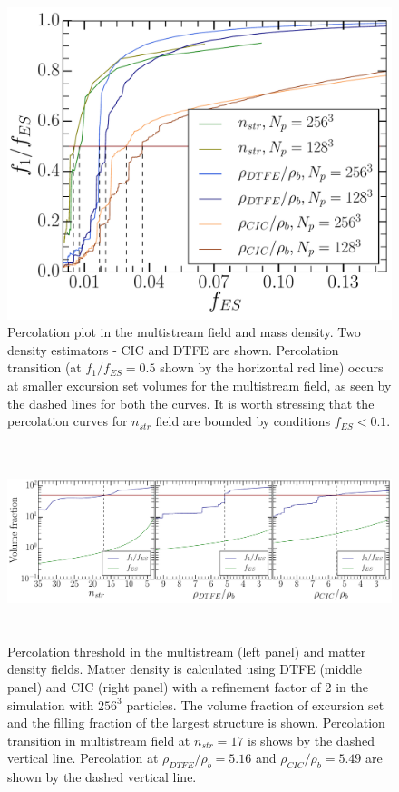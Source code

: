 \begin{figure}
\begin{minipage}[t]{.99\linewidth}
  \centering\includegraphics[width=10.cm]{Chapter4/Source_v2/fig4.pdf} 
\end{minipage}\hfill
\caption{Percolation plot in the multistream field and mass density. Two density estimators - CIC and DTFE are shown. Percolation transition (at $f_1/f_{ES} = 0.5$ shown by the horizontal red line) occurs at smaller excursion set volumes for the multistream field, as seen by the dashed lines for both the curves. It is worth stressing that the percolation curves for $n_{str}$ field are bounded by conditions $f_{ES} < 0.1$. }
\label{fig:PercTh}
\end{figure}

\begin{figure}
\begin{minipage}[t]{.99\linewidth}
  \centering\includegraphics[height=5.7cm]{Chapter4/Source_v2/fig5.pdf} 
\end{minipage}\hfill
\caption{Percolation threshold in the multistream (left panel) and matter density fields. Matter density is calculated using DTFE (middle panel) and CIC (right panel) with a refinement factor of 2 in the simulation with $256^3$ particles. The volume fraction of excursion set and the filling fraction of the largest structure is shown. Percolation transition in multistream field at $n_{str} = 17$ is shows by the dashed vertical line. Percolation at $\rho_{DTFE}/ \rho_b = 5.16 $ and $\rho_{CIC}/ \rho_b = 5.49 $ are shown by the dashed vertical line. }
\label{fig:HaloFil}
\end{figure}

